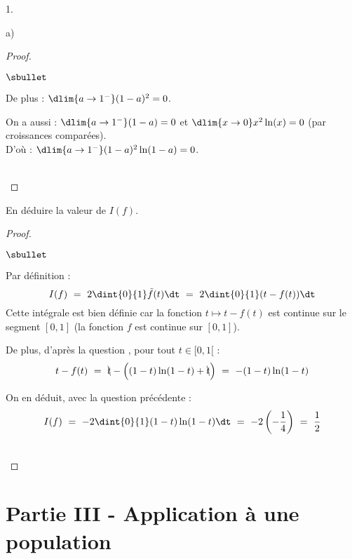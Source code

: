 \documentclass[11pt]{article}%
\begin{document}
\begin{noliste}{1.}
\begin{noliste}{a)}
\begin{proof}
\begin{noliste}{$\sbullet$}
      \item De plus : $\dlim{a \to 1^-} (1-a)^2=0$.
      \item On a aussi : $\dlim{a\to 1^-} (1-a)=0$ et 
      $\dlim{x\to 0} x^2\ln(x)=0$ (par croissances comparées).\\[.1cm]
      D'où : $\dlim{a\to 1^-} (1-a)^2 \ln(1-a)=0$.
    \end{noliste}
    ~\\[-1cm]
  \end{proof}
  
  \item En déduire la valeur de $I(f)$.
  
  \begin{proof}~
  \begin{noliste}{$\sbullet$}
    \item Par définition :
    \[
      I(f) \ = \ 2 \dint{0}{1} \tilde{f}(t) \dt \ = \ 2 \dint{0}{1} 
      (t-f(t)) \dt
    \]
    Cette intégrale est bien définie car la fonction $t \mapsto t - f(t)
    $ est continue sur le segment $[0,1]$ (la fonction $f$ est 
    continue sur $[0,1]$).
    
    \item De plus, d'après la question , pour tout $t \in 
    [0,1[$ :
    \[
      t-f(t) \ = \ \bcancel{t}-\Big((1-t)\ln(1-t) + \bcancel{t}\Big)
      \ = \ -(1-t)\ln(1-t)
    \]
    
    \item On en déduit, avec la question précédente : 
    \[
      I(f) \ = \ -2\dint{0}{1}(1-t) \ln(1-t) \dt \ = \ -2 
      \left(-\dfrac{1}{4} \right) \ = \ \dfrac{1}{2}
    \]
  \end{noliste}
  ~\\[-1cm]
  \end{proof}
 \end{noliste}
\end{noliste}




\section*{Partie III - Application à une population}
\end{document}
